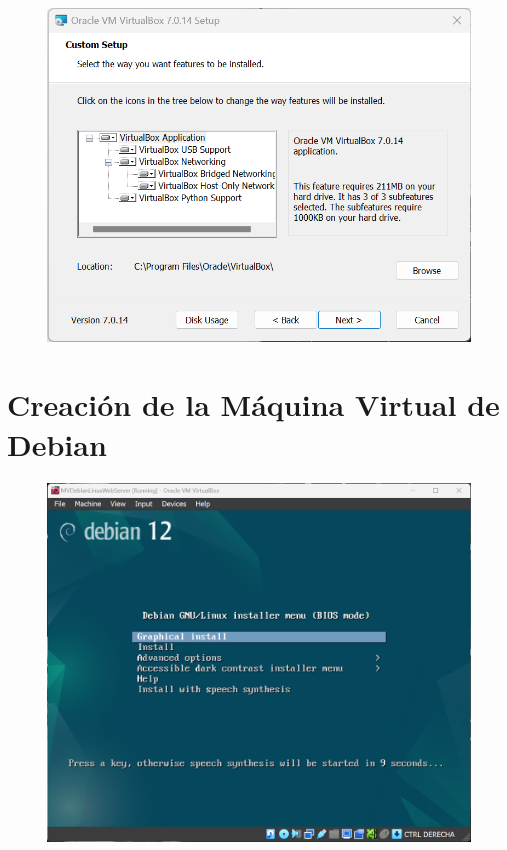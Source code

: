 \documentclass[12pt,a4paper]{article}
\begin{document}
\begin{figure}[H]
    \centering
    \includegraphics[width=1\linewidth]{M3_Virtualización_y_Contenedores/Tarea_2_Máquina_Virtual_Local/reporte/figuras/2-2_Instalación_Oracle_VM.png}
    \label{fig:Instalación_VirtualBox_2}
\end{figure}


\section{Creación de la Máquina Virtual de Debian}


\begin{figure}[H]
    \centering
    \includegraphics[width=1\linewidth]{M3_Virtualización_y_Contenedores/Tarea_2_Máquina_Virtual_Local/reporte/figuras/3-1_Máquina_Virtual_de_Debian.png}
    \label{fig:Instalación_Debian_1}
\end{figure}
\end{document}
